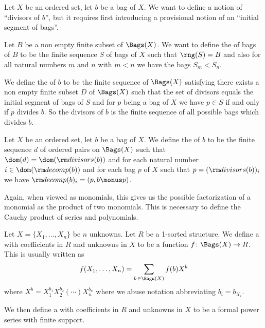 \begin{definition}
Let $X$ be an ordered set, let $b$ be a bag of $X$. We want to define
a notion of ``divisors of $b$'', but it requires first introducing a
provisional notion of an ``initial segment of bags''.

Let $B$ be a non empty finite subset of $\Bags(X)$.
We want to define the  of bags of $B$ to be
the finite sequence $S$ of bags of $X$ such that $\rng(S)=B$ and also
for all natural numbers $m$ and $n$ with $m < n$ we have the bags $S_{m}<S_{n}$.

We define the  of $b$ to be the finite sequence of
$\Bags(X)$ satisfying
there exists a non empty finite subset $D$ of $\Bags(X)$ such that
the set of divisors equals the initial segment of bags of $S$ and for
$p$ being a bag of $X$ we have $p\in S$ if and only if $p$ divides $b$.
So the divisors of $b$ is the finite sequence of all possible bags
which divides $b$.
\end{definition}

\begin{definition}
Let $X$ be an ordered set, let $b$ be a bag of $X$.
We define the  of $b$ to be the finite sequence $d$
of ordered pairs on $\Bags(X)$ such that
$\dom(d)=\dom({\rm divisors}(b))$ and
for each natural number $i\in\dom({\rm decomp}(b))$ and for each bag
$p$ of $X$ such that $p=({\rm divisors}(b))_{i}$ we have
${\rm decomp}(b)_{i} = (p, b \monus p)$.

Again, when viewed as monomials, this gives us the possible
factorization of a monomial as the product of two monomials. This is
necessary to define the Cauchy product of series and polynomials.
\end{definition}

\begin{definition}
Let $X = \{X_{1},\dots,X_{n}\}$ be $n$ unknowns.
Let $R$ be a 1-sorted structure.
We define a  with coefficients in $R$ and unknowns
in $X$ to be a function $f\colon\Bags(X)\to R$. This is usually
written as
\begin{equation}
f(X_{1},\dots,X_{n}) = \sum_{b\,\in\Bags(X)}f(b)X^{b}
\end{equation}
where $X^{b} = X_{1}^{b_{1}}X_{2}^{b_{2}}(\cdots)X_{n}^{b_{n}}$ where
we abuse notation abbreviating $b_{i}=b_{X_{i}}$.

We then define a  with coefficients in $R$
and unknowns in $X$ to be a formal power series with finite support.
\end{definition}

